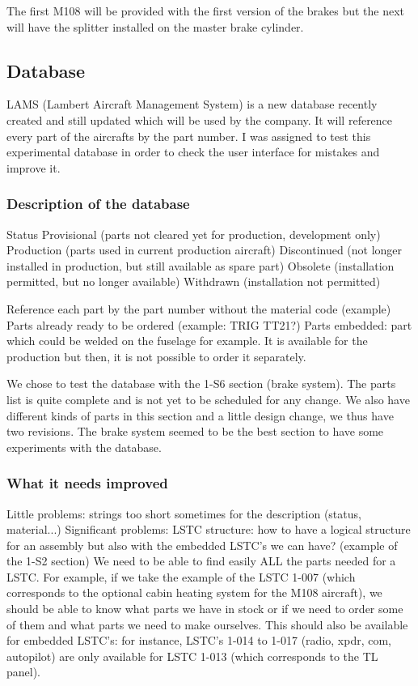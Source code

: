 \documentclass[11pt,a4paper]{article}
\begin{document}
The first M108 will be provided with the first version of the brakes but the next will have the splitter installed on the master brake cylinder.

\subsection{Database}
LAMS (Lambert Aircraft Management System) is a new database recently created and still updated which will be used by the company. It will reference every part of the aircrafts by the part number.
I was assigned to test this experimental database in order to check the user interface for mistakes and improve it.

\subsubsection{Description of the database}
Status
Provisional (parts not cleared yet for production, development only)
Production (parts used in current production aircraft)
Discontinued (not longer installed in production, but still available as spare part)
Obsolete (installation permitted, but no longer available)
Withdrawn (installation not permitted)

Reference each part by the part number without the material code (example)
Parts already ready to be ordered (example: TRIG TT21?)
Parts embedded: part which could be welded on the fuselage for example. It is available for the production but then, it is not possible to order it separately.

We chose to test the database with the 1-S6 section (brake system). The parts list is quite complete and is not yet to be scheduled for any change. We also have different kinds of parts in this section and a little design change, we thus have two revisions. The brake system seemed to be the best section to have some experiments with the database.

\subsubsection{What it needs improved}
Little problems: strings too short sometimes for the description (status, material...)
Significant problems: LSTC structure: how to have a logical structure for an assembly but also with the embedded LSTC's we can have? (example of the 1-S2 section)
We need to be able to find easily ALL the parts needed for a LSTC. For example, if we take the example of the LSTC 1-007 (which corresponds to the optional cabin heating system for the M108 aircraft), we should be able to know what parts we have in stock or if we need to order some of them and what parts we need to make ourselves.
This should also be available for embedded LSTC's: for instance, LSTC's 1-014 to 1-017 (radio, xpdr, com, autopilot) are only available for LSTC 1-013 (which corresponds to the TL panel).
\end{document}
